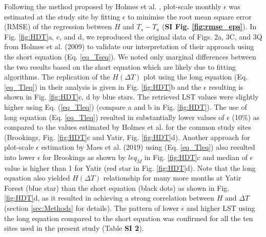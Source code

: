 \documentclass[fleqn,10pt]{wlscirep}
\begin{document}
Following the method proposed by Holmes et al. \cite{holmes_land_2009, holmes_cloud_2016}, plot-scale monthly $\epsilon$ was estimated at the study site by fitting $\epsilon$ to minimise the root mean square error (RMSE) of the regression between $H$ and $T_s - T_a$ (\textbf{SI Fig. \ref{fig:rmse_eps}}). In Fig. \ref{fig:HDT}a, c, and d, we reproduced the original data of Figs. 2a, 3C, and 3Q from Holmes et al. (2009) \cite{holmes_land_2009} to validate our interpretation of their approach using the short equation (Eq. \ref{eq_Tseq}). We noted only marginal differences between the two results based on the short equation which are likely due to fitting algorithms. The replication of the $H (\Delta T)$ plot using the long equation (Eq. \ref{eq_Tleq}) in their analysis is given in Fig. \ref{fig:HDT}b and the $\epsilon$ resulting is shown in Fig. \ref{fig:HDT}c, d by blue stars. The retrieved LST values were slightly higher using Eq. (\ref{eq_Tleq}) (compare a and b in Fig. \ref{fig:HDT}). The use of long equation (Eq. \ref{eq_Tleq}) resulted in substantially lower values of $\epsilon$ (10\%) as compared to the values estimated by Holmes et al.\cite{holmes_land_2009} for the common study sites (Brookings, Fig. \ref{fig:HDT}c and Yatir, Fig. \ref{fig:HDT}d). Another approach for plot-scale $\epsilon$ estimation by Maes et al. (2019) \cite{maes2019potential} using (Eq. \ref{eq_Tleq})  also resulted into lower $\epsilon$ for Brookings as shown by $leq_{M}$ in Fig. \ref{fig:HDT}c and median of $\epsilon$ value is higher than 1 for Yatir (red star in  Fig. \ref{fig:HDT}d). Note that the long equation also yielded $H(\Delta T)$ relationship for many more months at Yatir Forest (blue star) than the short equation (black dots) as shown in Fig. \ref{fig:HDT}d, as it resulted in achieving a strong correlation between $H$ and $\Delta T$ (section \ref{sec:Methods} for details). The pattern of lower $\epsilon$ and higher LST using the long equation compared to the short equation was confirmed for all the ten sites used in the present study (Table \textbf{SI 2}).
\end{document}

